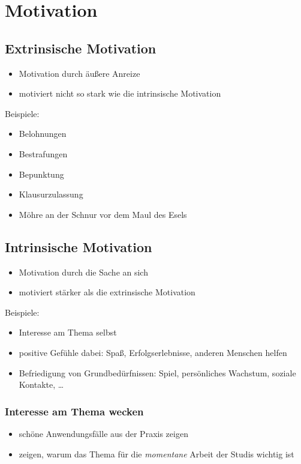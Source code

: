 \chapter{Motivation}
\label{motivation}

\section{Extrinsische Motivation}
\begin{itemize}
  \item Motivation durch äußere Anreize
  \item motiviert nicht so stark wie die intrinsische Motivation
\end{itemize}

Beispiele:

\begin{itemize}
  \item Belohnungen
  \item Bestrafungen
  \item Bepunktung
  \item Klausurzulassung
  \item Möhre an der Schnur vor dem Maul des Esels
\end{itemize}


\section{Intrinsische Motivation}
\begin{itemize}
  \item Motivation durch die Sache an sich
  \item motiviert stärker als die extrinsische Motivation
\end{itemize}

Beispiele:

\begin{itemize}
  \item Interesse am Thema selbst
  \item positive Gefühle dabei: Spaß, Erfolgserlebnisse, anderen Menschen helfen
  \item Befriedigung von Grundbedürfnissen: Spiel, persönliches Wachstum, soziale Kontakte, \ldots
\end{itemize}

\subsection{Interesse am Thema wecken}
\begin{itemize}
  \item schöne Anwendungsfälle aus der Praxis zeigen
  \item zeigen, warum das Thema für die \emph{momentane} Arbeit der Studis wichtig ist
\end{itemize}
